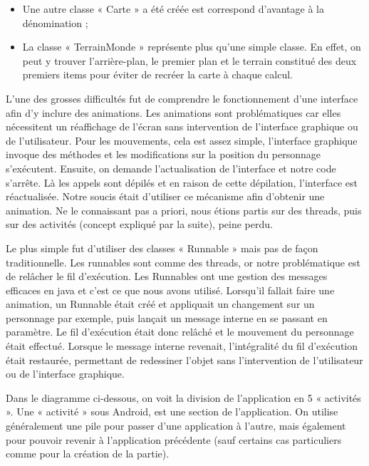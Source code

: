\documentclass{report}
\begin{document}
\begin{itemize}
\item Une autre classe « Carte » a été créée est correspond
d’avantage à la dénomination ;
\item La classe « TerrainMonde » représente plus qu’une simple
classe. En effet, on peut y trouver l’arrière-plan, le premier
plan et le terrain constitué des deux premiers items pour éviter
de recréer la carte à chaque calcul.
\end{itemize}
L’une des grosses difficultés fut de comprendre le fonctionnement
d’une interface afin d’y inclure des animations. Les animations sont
problématiques car elles nécessitent un réaffichage de l’écran sans
intervention de l’interface graphique ou de l’utilisateur. Pour les
mouvements, cela est assez simple, l’interface graphique invoque des
méthodes et les modifications sur la position du personnage s’exécutent.
Ensuite, on demande l’actualisation de l’interface et notre code
s'arrête. Là les appels sont dépilés et en raison de cette dépilation,
l’interface est réactualisée. Notre soucis était d’utiliser ce mécanisme
afin d’obtenir une animation. Ne le connaissant pas a priori, nous
étions partis sur des threads, puis sur des activités (concept expliqué
par la suite), peine perdu.

Le plus simple fut d’utiliser des classes « Runnable » mais pas de façon
traditionnelle. Les runnables sont comme des threads, or notre
problématique est de relâcher le fil d'exécution. Les Runnables ont une
gestion des messages efficaces en java et c’est ce que nous avons
utilisé. Lorsqu’il fallait faire une animation, un Runnable était créé
et appliquait un changement sur un personnage par exemple, puis lançait
un message interne en se passant en paramètre. Le fil d'exécution était
donc relâché et le mouvement du personnage était effectué.
Lorsque le message interne revenait, l’intégralité du fil d'exécution
était restaurée, permettant de redessiner l’objet sans l’intervention
de l’utilisateur ou de l’interface graphique.

Dans le diagramme ci-dessous, on voit la division de l’application en
5 « activités ». 
Une « activité » sous Android, est une section de l’application. On
utilise généralement une pile pour passer d’une application à l’autre,
mais également pour pouvoir revenir à l’application précédente (sauf
certains cas particuliers comme pour la création de la partie).
\end{document}
